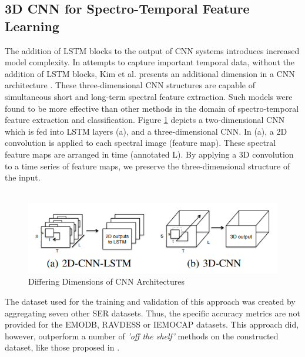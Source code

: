 \subsection{3D CNN for Spectro-Temporal Feature Learning}
The addition of LSTM blocks to the output of CNN systems introduces increased model complexity. In attempts to capture important temporal data, without the addition of LSTM blocks, Kim et al. presents an additional dimension in a CNN architecture \cite{kim2017speech}. These three-dimensional CNN structures are capable of simultaneous short and long-term spectral feature extraction. Such models were found to be more effective than other methods in the domain of spectro-temporal feature extraction and classification. Figure \ref{3dcnn_fig} depicts a two-dimensional CNN which is fed into LSTM layers (a), and a three-dimensional CNN. In (a), a 2D convolution is applied to each spectral image (feature map). These spectral feature maps are arranged in time (annotated L). By applying a 3D convolution to a time series of feature maps, we preserve the three-dimensional structure of the input. \\ \\
\begin{figure}[h]
        \centering
        \includegraphics[scale = 0.8]{images/3dcnn_IMG.png}
        \caption{Differing Dimensions of CNN Architectures \cite{kim2017speech}}
        \label{3dcnn_fig}
\end{figure}
The dataset used for the training and validation of this approach was created by aggregating seven other SER datasets. Thus, the specific accuracy metrics are not provided for the EMODB, RAVDESS or IEMOCAP datasets. This approach did, however, outperform a number of \textit{'off the shelf'} methods on the constructed dataset, like those proposed in \cite{ZHAO2019}.



